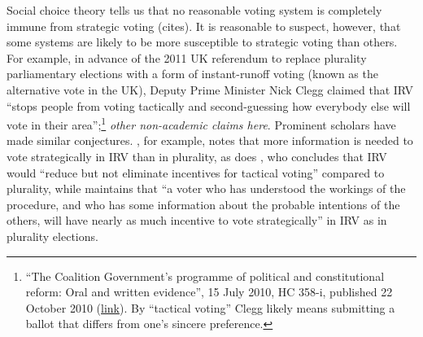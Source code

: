 \documentclass[11pt,a4paper]{article}
\begin{document}
Social choice theory tells us that no reasonable voting system is completely immune from strategic voting (cites). %
It is reasonable to suspect, however, that %
some systems are likely to be more susceptible to strategic voting than others. 
For example, in advance of the 2011 UK referendum to replace plurality parliamentary elections with a form of instant-runoff voting (known as the alternative vote in the UK), Deputy Prime Minister Nick Clegg claimed that IRV ``stops people from voting tactically and second-guessing how everybody else will vote in their area'';\footnote{``The Coalition
Government’s programme of political and constitutional reform: Oral and written evidence'', 15 July 2010, HC 358-i, published 22 October 2010 (\href{https://publications.parliament.uk/pa/cm201011/cmselect/cmpolcon/358/358i.pdf}{link}). By ``tactical voting'' Clegg likely means submitting a ballot that differs from one's sincere preference.} \emph{other non-academic claims here}. Prominent scholars have made similar conjectures. %
\citet[][95]{cox1997making}, for example, notes that more information is needed to vote strategically in IRV than in plurality, as does \citet[][pp.\ 6-7]{renwick2011alternative}, who concludes that IRV would ``reduce but not eliminate incentives for tactical voting'' compared to plurality, while \citet[][p.\ 228]{dummett1984voting} maintains that ``a voter who has understood the workings of the procedure, and who has some information about the probable intentions of the others, will have nearly as much incentive to vote strategically'' in IRV as in plurality elections.
\end{document}
